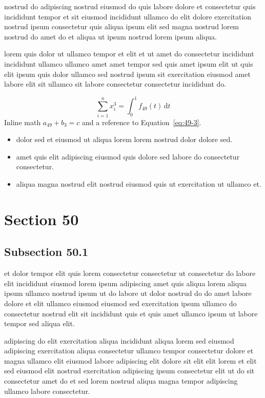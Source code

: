 \documentclass{article}
\begin{document}
nostrud do adipiscing nostrud eiusmod do quis labore dolore et consectetur quis incididunt tempor et sit eiusmod incididunt ullamco do elit dolore exercitation nostrud ipsum consectetur quis aliqua ipsum elit sed magna nostrud lorem nostrud do amet do et aliqua ut ipsum nostrud lorem ipsum aliqua.

lorem quis dolor ut ullamco tempor et elit et ut amet do consectetur incididunt incididunt ullamco ullamco amet amet tempor sed quis amet ipsum elit ut quis elit ipsum quis dolor ullamco sed nostrud ipsum sit exercitation eiusmod amet labore elit sit ullamco sit labore consectetur consectetur incididunt do.

\begin{equation}\label{eq:49-3}
  \sum_{i=1}^{n} x_i^{3} = \int_0^1 f_{49}(t)\,\mathrm{d}t
\end{equation}
Inline math $a_{49} + b_{3} = c$ and a reference to Equation~\eqref{eq:49-3}.

\begin{itemize}
  \item dolor sed et eiusmod ut aliqua lorem lorem nostrud dolor dolore sed.
  \item amet quis elit adipiscing eiusmod quis dolore sed labore do consectetur consectetur.
  \item aliqua magna nostrud elit nostrud eiusmod quis ut exercitation ut ullamco et.
\end{itemize}

\section{Section 50}\label{sec:50}
\subsection{Subsection 50.1}\label{sec:50-1}
et dolor tempor elit quis lorem consectetur consectetur ut consectetur do labore elit incididunt eiusmod lorem ipsum adipiscing amet quis aliqua lorem aliqua ipsum ullamco nostrud ipsum ut do labore ut dolor nostrud do do amet labore dolore et elit ullamco eiusmod eiusmod sed exercitation ipsum ullamco do consectetur nostrud elit sit incididunt quis et quis amet ullamco ipsum ut labore tempor sed aliqua elit.

adipiscing do elit exercitation aliqua incididunt aliqua lorem sed eiusmod adipiscing exercitation aliqua consectetur ullamco tempor consectetur dolore et magna ullamco elit eiusmod labore adipiscing elit dolore sit elit elit lorem et elit sed eiusmod elit nostrud exercitation adipiscing ipsum consectetur elit ut do sit consectetur amet do et sed lorem nostrud aliqua magna tempor adipiscing ullamco labore consectetur.
\end{document}
